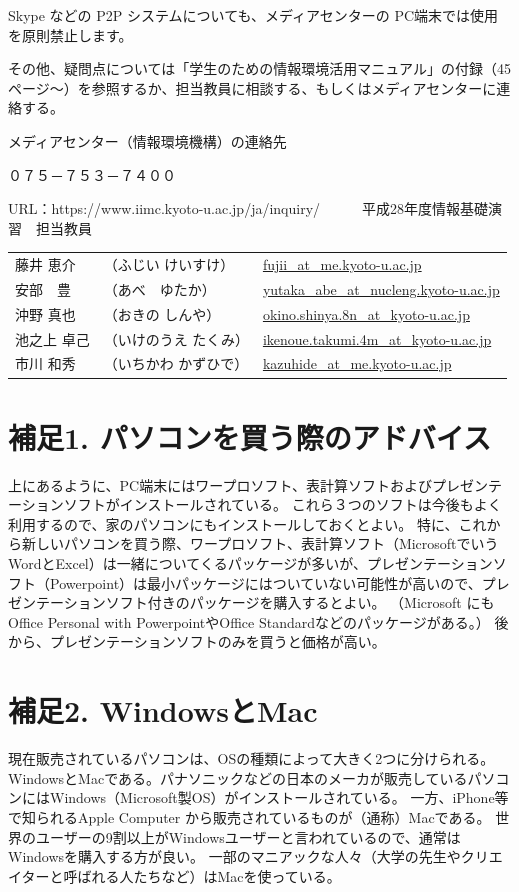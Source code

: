 Skype などの P2P システムについても、メディアセンターの PC端末では使用を原則禁止します。

その他、疑問点については「学生のための情報環境活用マニュアル」の付録（45ページ～）を参照するか、担当教員に相談する、もしくはメディアセンターに連絡する。


メディアセンター（情報環境機構）の連絡先

０７５－７５３－７４００

URL：https://www.iimc.kyoto-u.ac.jp/ja/inquiry/
　
　
平成28年度情報基礎演習　担当教員
\begin{table}[htb]
  \begin{tabular}{lll}
  藤井 恵介　&（ふじい けいすけ）	& \url{fujii_at_me.kyoto-u.ac.jp}　\\
  安部　豊 & （あべ　ゆたか）　& \url{yutaka_abe_at_nucleng.kyoto-u.ac.jp} \\
  沖野 真也 & （おきの しんや） & \url{okino.shinya.8n_at_kyoto-u.ac.jp} \\
  池之上 卓己 &（いけのうえ たくみ）&\url{ikenoue.takumi.4m_at_kyoto-u.ac.jp}\\
  市川 和秀&（いちかわ かずひで） &\url{kazuhide_at_me.kyoto-u.ac.jp}\\
  \end{tabular}
\end{table}

\section{補足1. パソコンを買う際のアドバイス}
上にあるように、PC端末にはワープロソフト、表計算ソフトおよびプレゼンテーションソフトがインストールされている。
これら３つのソフトは今後もよく利用するので、家のパソコンにもインストールしておくとよい。
特に、これから新しいパソコンを買う際、ワープロソフト、表計算ソフト（MicrosoftでいうWordとExcel）は一緒についてくるパッケージが多いが、プレゼンテーションソフト（Powerpoint）は最小パッケージにはついていない可能性が高いので、プレゼンテーションソフト付きのパッケージを購入するとよい。
（Microsoft にもOffice Personal with PowerpointやOffice Standardなどのパッケージがある。）
後から、プレゼンテーションソフトのみを買うと価格が高い。

\section{補足2. WindowsとMac}
現在販売されているパソコンは、OSの種類によって大きく2つに分けられる。
WindowsとMacである。パナソニックなどの日本のメーカが販売しているパソコンにはWindows（Microsoft製OS）がインストールされている。
一方、iPhone等で知られるApple Computer から販売されているものが（通称）Macである。
世界のユーザーの9割以上がWindowsユーザーと言われているので、通常はWindowsを購入する方が良い。
一部のマニアックな人々（大学の先生やクリエイターと呼ばれる人たちなど）はMacを使っている。
